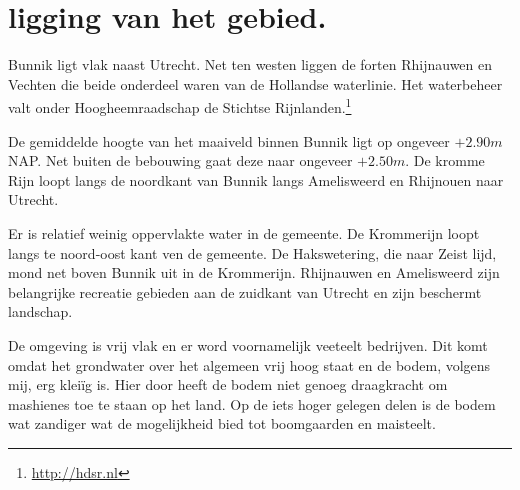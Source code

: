\section{ligging van het gebied.}
Bunnik ligt vlak naast Utrecht.
Net ten westen liggen de forten Rhijnauwen en Vechten die beide onderdeel waren van de Hollandse waterlinie.
Het waterbeheer valt onder Hoogheemraadschap de Stichtse Rijnlanden.\footnote{\url{http://hdsr.nl}}

De gemiddelde hoogte van het maaiveld binnen Bunnik ligt op ongeveer $+2.90 m$ NAP.
Net buiten de bebouwing gaat deze naar ongeveer $+2.50 m$.
De kromme Rijn loopt langs de noordkant van Bunnik langs Amelisweerd en Rhijnouen naar Utrecht.

Er is relatief weinig oppervlakte water in de gemeente.
De Krommerijn loopt langs te noord-oost kant ven de gemeente.
De Hakswetering, die naar Zeist lijd, mond net boven Bunnik uit in de Krommerijn.
Rhijnauwen en Amelisweerd zijn belangrijke recreatie gebieden aan de zuidkant van Utrecht 
en zijn beschermt landschap.

De omgeving is vrij vlak en er word voornamelijk veeteelt bedrijven.
Dit komt omdat het grondwater over het algemeen vrij hoog staat en de bodem, volgens mij, erg klei\"ig is.
Hier door heeft de bodem niet genoeg draagkracht om mashienes toe te staan op het land.
Op de iets hoger gelegen delen is de bodem wat zandiger wat de mogelijkheid bied tot boomgaarden en maisteelt.




